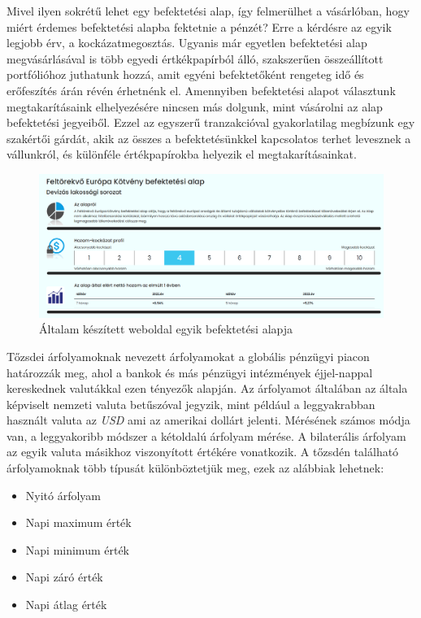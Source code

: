 	Mivel ilyen sokrétű lehet egy befektetési alap, így felmerülhet a vásárlóban, hogy miért érdemes befektetési alapba fektetnie a pénzét? Erre a kérdésre az egyik legjobb érv, a kockázatmegosztás. Ugyanis már egyetlen befektetési alap megvásárlásával is több egyedi értkékpapírból álló, szakszerűen összeállított portfólióhoz juthatunk hozzá, amit egyéni befektetőként rengeteg idő és erőfeszítés árán révén érhetnénk el. Amennyiben befektetési alapot választunk megtakarításaink elhelyezésére nincsen más dolgunk, mint vásárolni az alap befektetési jegyeiből. Ezzel az egyszerű tranzakcióval gyakorlatilag megbízunk egy szakértői gárdát, akik az összes a befektetésünkkel kapcsolatos terhet levesznek a vállunkról, és különféle értékpapírokba helyezik el megtakarításainkat.

\begin{figure}[h]
\centering
\includegraphics[scale=0.3]{images/europeInvestExample}
\caption{Általam készített weboldal egyik befektetési alapja}
\end{figure}


Tőzsdei árfolyamoknak nevezett árfolyamokat a globális pénzügyi piacon határozzák meg, ahol a bankok és más pénzügyi intézmények éjjel-nappal kereskednek valutákkal ezen tényezők alapján. Az árfolyamot általában az általa képviselt nemzeti valuta betűszóval jegyzik, mint például a leggyakrabban használt valuta az \emph{USD} ami az amerikai dollárt jelenti. Mérésének számos módja van, a  leggyakoribb módszer a kétoldalú árfolyam mérése. A bilaterális árfolyam az egyik valuta másikhoz viszonyított értékére vonatkozik. A tőzsdén található árfolyamoknak több típusát különböztetjük meg, ezek az alábbiak lehetnek: 
\begin{itemize}
\item Nyitó árfolyam
\item Napi maximum érték
\item Napi minimum érték
\item Napi záró érték
\item Napi átlag érték
\end{itemize}

